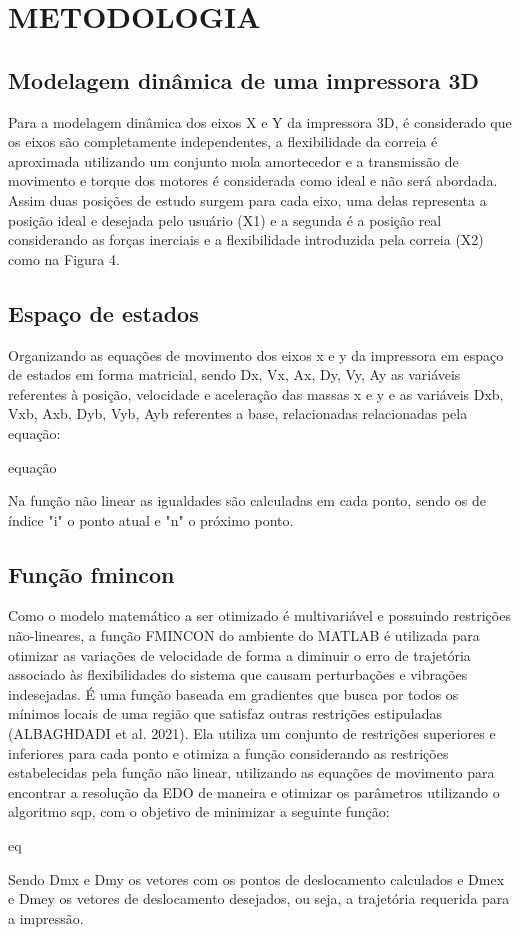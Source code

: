 \chapter{METODOLOGIA}

\section{Modelagem dinâmica de uma impressora 3D}
Para a modelagem dinâmica dos eixos X e Y da impressora 3D, 
é considerado que os eixos são completamente independentes, 
a flexibilidade da correia é aproximada utilizando um conjunto 
mola amortecedor e a transmissão de movimento e torque dos 
motores é considerada como ideal e não será abordada.
Assim duas posições de estudo surgem para cada eixo, uma delas 
representa a posição ideal e desejada pelo usuário (X1) e a 
segunda é a posição real considerando as forças inerciais e a 
flexibilidade introduzida pela correia (X2) como na Figura 4.

\section{Espaço de estados}
Organizando as equações de movimento dos eixos x e y da 
impressora em espaço de estados em forma matricial, sendo 
Dx, Vx, Ax, Dy, Vy, Ay as variáveis referentes à posição,
velocidade e aceleração das massas x e y e as variáveis Dxb, 
Vxb, Axb, Dyb, Vyb, Ayb referentes a base, relacionadas 
relacionadas pela equação:

equação

Na função não linear as igualdades são calculadas em cada ponto, 
sendo os de índice "i" o ponto atual e "n" o próximo ponto.

\section{Função fmincon}
Como o modelo matemático a ser otimizado é multivariável e 
possuindo restrições não-lineares, a função FMINCON do ambiente 
do MATLAB é utilizada para otimizar as variações de velocidade 
de forma a diminuir o erro de trajetória associado às 
flexibilidades do sistema que causam perturbações e vibrações 
indesejadas.
É uma função baseada em gradientes que busca por todos os 
mínimos locais de uma região que satisfaz outras restrições 
estipuladas (ALBAGHDADI et al. 2021).
Ela utiliza um conjunto de restrições superiores e inferiores 
para cada ponto e otimiza a função considerando as restrições 
estabelecidas pela função não linear, utilizando as equações de 
movimento para encontrar a resolução da EDO de maneira e 
otimizar os parâmetros utilizando o algoritmo sqp, com o 
objetivo de minimizar a seguinte função:

eq

Sendo Dmx e Dmy os vetores com os pontos de deslocamento 
calculados e Dmex e Dmey os vetores de deslocamento desejados, 
ou seja, a trajetória requerida para a impressão.